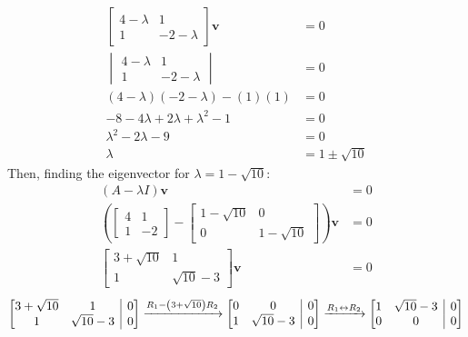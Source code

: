 \documentclass[11pt]{article}
\makeatletter
\newenvironment{amatrix}[1]{%
    \left[\begin{array}{@{}*{#1}{c}|c@{}}
}{%
    \end{array}\right]
}
\makeatother
\begin{document}
\begin{enumerate}[label=\textbf{\arabic*.}, start=3]
{\begin{enumerate}[label=\textbf{(\alph*)}]
{\begin{align*}
                        \begin{bmatrix}4-\lambda & 1 \\ 1 & -2-\lambda\end{bmatrix}\mathbf{v}&=0 \\
                        \begin{vmatrix}4-\lambda & 1 \\ 1 & -2-\lambda\end{vmatrix}&=0 \\
                        (4-\lambda)(-2-\lambda)-(1)(1)&=0 \\
                        -8-4\lambda+2\lambda+\lambda^2-1&=0 \\
                        \lambda^2-2\lambda-9&=0 \\
                        \lambda&=1\pm\sqrt{10}
                    \end{align*}
                    Then, finding the eigenvector for \(\lambda=1-\sqrt{10}\):
                    \begin{align*}
                        (A-\lambda I)\mathbf{v}&=0 \\
                        \left(\begin{bmatrix}4 & 1 \\ 1 & -2\end{bmatrix}-\begin{bmatrix}1-\sqrt{10} & 0 \\ 0 & 1-\sqrt{10}\end{bmatrix}\right)\mathbf{v}&=0 \\
                        \begin{bmatrix}3+\sqrt{10} & 1 \\ 1 & \sqrt{10}-3\end{bmatrix}\mathbf{v}&=0
                    \end{align*}
                    \begin{equation*}
                        \begin{amatrix}{2}3+\sqrt{10} & 1 & 0 \\ 1 & \sqrt{10}-3 & 0\end{amatrix}
                        \xrightarrow{R_1-\left(3+\sqrt{10}\right)R_2}
                        \begin{amatrix}{2}0 & 0 & 0 \\ 1 & \sqrt{10}-3 & 0\end{amatrix}
                        \xrightarrow{R_1\leftrightarrow R_2}
                        \begin{amatrix}{2}1 & \sqrt{10}-3 & 0 \\ 0 & 0 & 0\end{amatrix}

\end{equation*}}
\end{enumerate}}
\end{enumerate}
\end{document}

